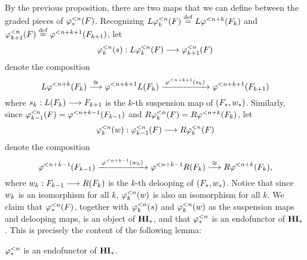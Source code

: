 By the previous proposition, there are two maps that we can
define between the graded pieces of $\tlHM{n}(F)$. Recognizing
$L\tlHM[k]{n}(F) \defeq L \tlHI{n + k}(F_k)$ and 
$\tlHM[k + 1]{n}(F) \defeq \tlHI{n + k + 1}(F_{k + 1})$, let
\[
\suspTL[k]{n} : L\tlHM[k]{n}(F) \to \tlHM[k + 1]{n}(F)
\]
denote the composition
\begin{equation}\label{eq_susp_def}
L \tlHI{n + k}(F_k) \stackrel{\cong}{\to} 
   \tlHI{n + k + 1}L(F_k) 
   \xrightarrow{\;\tlHI{n + k + 1}(\susp_k)\;} 
   \tlHI{n + k + 1}(F_{k + 1})
\end{equation}
where $\susp_k: L(F_k) \to F_{k + 1}$ is the $k$-th suspension 
map of $(F_*, \deloop_*)$. Similarly, since $\tlHM[k - 1]{n}(F) = 
\tlHI{n + k - 1}(F_{k - 1})$ and $R \tlHM[k]{n}(F) = 
R\tlHI{n + k}(F_{k})$, let
\[
\deloopTL[k]{n} : \tlHM[k - 1]{n}(F) \to R \tlHM[k]{n}(F) 
\]
denote the composition
\begin{equation}\label{eq_deloop_def}
\tlHI{n + k - 1}(F_{k - 1})
   \xrightarrow{\;\tlHI{n + k - 1}(\deloop_k)\;} 
   \tlHI{n + k - 1} R(F_k) \stackrel{\cong}{\to} 
   R \tlHI{n + k}(F_k),
\end{equation}
where $\deloop_k: F_{k - 1} \to R(F_k)$ is the $k$-th delooping
of $(F_*, \deloop_*)$. Notice that since $\deloop_k$ is an isomorphism 
for all $k$, $\deloopTL[k]{n}$ is also an isomorphism for 
all $k$. We claim that $\tlHM{n}(F)$, together with $\suspTL[k]{n}$ and
$\deloopTL[k]{n}$ as the suspension maps and delooping maps,
is an object of $\HM$, and that $\tlHM{n}$ is an endofunctor of $\HM$.
This is precisely the content of the following lemma:

\begin{lem}\label{lem_tlHM_is_functor}
$\tlHM{n}$ is an endofunctor of $\HM$.
\end{lem}


